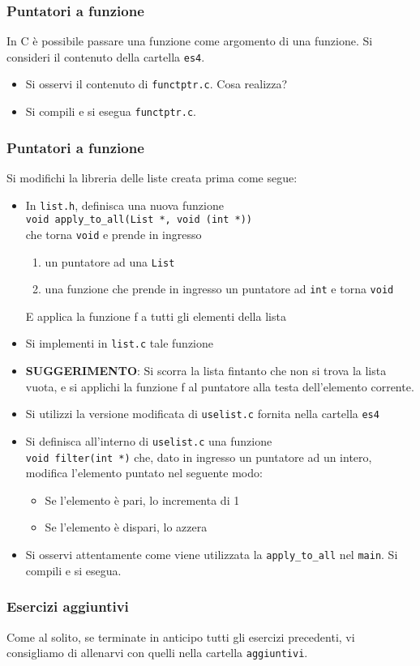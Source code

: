 \documentclass{beamer}
\begin{document}
\begin{frame}[fragile]
\frametitle{Puntatori a funzione}
In C è possibile passare una funzione come argomento di una funzione. Si consideri il contenuto della cartella \texttt{es4}.
\begin{itemize}
 \item Si osservi il contenuto di \texttt{functptr.c}. Cosa realizza?
 \item Si compili e si esegua \texttt{functptr.c}.
\end{itemize}
\end{frame}

\begin{frame}[fragile]
\frametitle{Puntatori a funzione}
Si modifichi la libreria delle liste creata prima come segue:
\begin{itemize}
 \item In \texttt{list.h}, definisca una nuova funzione\\ \texttt{void apply\_to\_all(List *, void (int *))}\\ che torna \texttt{void} e prende in ingresso
 \begin{enumerate}
  \scriptsize
  \item un puntatore ad una \texttt{List}
  \item una funzione che prende in ingresso un puntatore ad \texttt{int} e torna \texttt{void}
 \end{enumerate}
 E applica la funzione f a tutti gli elementi della lista
 \item Si implementi in \texttt{list.c} tale funzione
 \scriptsize
 \item \textbf{SUGGERIMENTO}: Si scorra la lista fintanto che non si trova la lista vuota, e si applichi la funzione f al puntatore alla testa dell'elemento corrente.
 \normalsize
 \item Si utilizzi la versione modificata di \texttt{uselist.c} fornita nella cartella \texttt{es4}
 \item Si definisca all'interno di \texttt{uselist.c} una funzione \\ \texttt{void filter(int *)} che, dato in ingresso un puntatore ad un intero, modifica l'elemento puntato nel seguente modo:
 \begin{itemize}
  \item Se l'elemento è pari, lo incrementa di 1
  \item Se l'elemento è dispari, lo azzera
 \end{itemize}
 \item Si osservi attentamente come viene utilizzata la \texttt{apply\_to\_all} nel \texttt{main}. Si compili e si esegua.
\end{itemize}
\end{frame}

\begin{frame}[fragile]
\frametitle{Esercizi aggiuntivi}
Come al solito, se terminate in anticipo tutti gli esercizi precedenti, vi consigliamo di allenarvi con quelli nella cartella \texttt{aggiuntivi}.
\end{frame}
\end{document}
